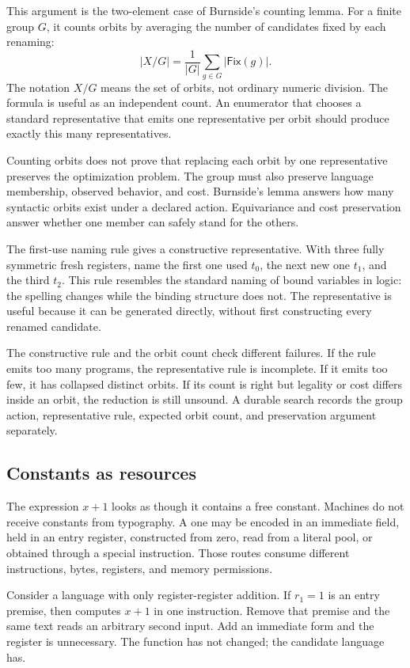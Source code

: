 This argument is the two-element case of Burnside's counting lemma. For a
finite group \(G\), it counts orbits by averaging the number of candidates
fixed by each renaming:
\[
  |X/G|
  =\frac{1}{|G|}\sum_{g\in G}|\mathsf{Fix}(g)|.
\]
The notation \(X/G\) means the set of orbits, not ordinary numeric division.
The formula is useful as an independent count. An enumerator that chooses a
standard representative
that emits one representative per orbit should produce exactly this many
representatives.

Counting orbits does not prove that replacing each orbit by one representative
preserves the optimization problem. The group must also preserve language membership, observed behavior,
and cost. Burnside's lemma answers how many syntactic orbits exist under a
declared action. Equivariance and cost preservation answer whether one member
can safely stand for the others.

The first-use naming rule gives a constructive representative. With three
fully symmetric fresh registers, name the first one used \(t_0\), the next new
one \(t_1\), and the third \(t_2\). This rule resembles the standard naming of
bound variables in logic: the spelling changes while the binding structure
does not. The representative is useful because it can be generated directly,
without first constructing every renamed candidate.

The constructive rule and the orbit count check different failures. If the
rule emits too many programs, the representative rule is incomplete. If it emits too
few, it has collapsed distinct orbits. If its count is right but legality or
cost differs inside an orbit, the reduction is still unsound. A durable search
records the group action, representative rule, expected orbit count, and
preservation argument separately.

\subsection{Constants as resources}

The expression \(x+1\) looks as though it contains a free constant. Machines
do not receive constants from typography. A one may be encoded in an
immediate field, held in an entry register, constructed from zero, read from a
literal pool, or obtained through a special instruction. Those routes consume
different instructions, bytes, registers, and memory permissions.

Consider a language with only register-register addition. If \(r_1=1\) is an
entry premise, then  computes \(x+1\) in one instruction.
Remove that premise and the same text reads an arbitrary second input. Add an
immediate form and the register is unnecessary. The function has not changed;
the candidate language has.

